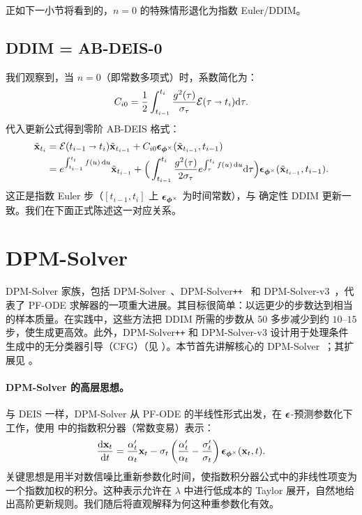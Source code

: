 正如下一小节将看到的，$n{=}0$ 的特殊情形退化为指数 Euler/DDIM。



\subsection{DDIM = AB-DEIS-0}\label{sec:ddim-deis} 我们观察到，当 $ n = 0 $（即常数多项式）时，系数简化为：
\[
C_{i0} = \frac{1}{2} \int_{t_{i-1}}^{t_{i}} \frac{g^2(\tau)}{\sigma_\tau} \mathcal{E}(\tau \shortrightarrow t_i)   \mathrm{d}\tau.
\]
代入更新公式得到零阶 AB-DEIS 格式：
\begin{align}\label{eq:deis-0}
  \tilde{{\mathbf{x}}}_{t_{i}} &=  \mathcal{E}(t_{i-1} \shortrightarrow t_{i})\tilde{{\mathbf{x}}}_{t_{i-1}} + C_{i0} \bm{\epsilon}_{\bm{\phi}^\times}(\tilde{{\mathbf{x}}}_{t_{i-1}}, t_{i-1})\nonumber\\
  &=e^{\int_{t_{i-1}}^{t_{i}}f(u)\mathop{}\!\mathrm{d} u} \tilde{{\mathbf{x}}}_{t_{i-1}} + \Big( \int_{t_{i-1}}^{t_{i}} \frac{g^2(\tau)}{2\sigma_\tau} e^{\int_{\tau}^{t_{i}}f(u)\mathop{}\!\mathrm{d} u}   \mathrm{d}\tau
\Big) \bm{\epsilon}_{\bm{\phi}^\times}(\tilde{{\mathbf{x}}}_{t_{i-1}}, t_{i-1}).  
\end{align}
这正是指数 Euler 步（$[t_{i-1},t_i]$ 上 ${\bm{\epsilon}}_{{\bm{\phi}}^\times}$ 为时间常数），与
确定性 DDIM 更新一致。我们在下面正式陈述这一对应关系。


    
\clearpage
\newpage



\section{\texorpdfstring{DPM-Solver}{DPM-Solver}}\label{sec:dpm}

DPM-Solver 家族，包括 DPM-Solver~\citep{lu2022dpm}、DPM-Solver\texttt{++}~\citep{lu2022dpm2} 和 DPM-Solver-v3~\citep{zheng2023dpm}，代表了 PF-ODE 求解器的一项重大进展。其目标很简单：以远更少的步数达到相当的样本质量。在实践中，这些方法把 DDIM 所需的步数从 $50$ 多步减少到约 $10$--$15$ 步，使生成更高效。此外，DPM-Solver\texttt{++} 和 DPM-Solver-v3 设计用于处理条件生成中的无分类器引导（CFG）（见 ）。本节首先讲解核心的 DPM-Solver~\citep{lu2022dpm}；其扩展见 。

\paragraph{DPM-Solver 的高层思想。}
与 DEIS 一样，DPM-Solver 从 PF-ODE 的半线性形式出发，在 ${\bm{\epsilon}}$-预测参数化下工作，使用  中的指数积分器（常数变易）表示：
\begin{align}\label{eq:noise-alpha-sigma}
    \frac{\mathop{}\!\mathrm{d} {\mathbf{x}}_t}{\mathop{}\!\mathrm{d} t}
= \frac{\alpha_t'}{\alpha_t}{\mathbf{x}}_t
- \sigma_t \left(\frac{\alpha_t'}{\alpha_t}-\frac{\sigma_t'}{\sigma_t}\right)
{\bm{\epsilon}}_{{\bm{\phi}}^\times}({\mathbf{x}}_t,t).
\end{align}
关键思想是用半对数信噪比重新参数化时间，使指数积分器公式中的非线性项变为一个指数加权的积分。这种表示允许在 $\lambda$ 中进行低成本的 Taylor 展开，自然地给出高阶更新规则。我们随后将直观解释为何这种重参数化有效。



